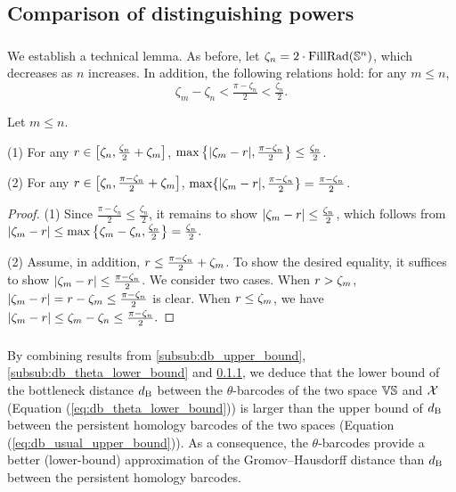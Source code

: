 \subsection{Comparison of distinguishing powers}
\label{subsub:main_theorem}

\subsubsection{}
\label{subsub:comparison_lemma}

We establish a technical lemma. 
As before, let $\zeta_n = 2 \cdot \operatorname{FillRad}(\mathbb{S}^n)$, which decreases as $n$ increases.
In addition, the following relations hold: for any $m \leq n$,
\[\zeta_m - \zeta_n < \tfrac{\pi - \zeta_n}{2} < \tfrac{\zeta_n}{2}.\]

\medskip\lemma
Let $m \leq n$. 

(1) For any $r \in \big[\zeta_n, \tfrac{\zeta_n}{2}+\zeta_m\big]$, $\max\big\{|\zeta_m  - r |, \tfrac{\pi - \zeta_n}{2}\big\} \leq \tfrac{\zeta_n}{2}$.

(2) For any $r \in \big[\zeta_n, \tfrac{\pi - \zeta_n}{2} + \zeta_m\big]$, $\max\{|\zeta_m  - r |, \tfrac{\pi - \zeta_n}{2}\} = \tfrac{\pi - \zeta_n}{2}$.

\begin{proof}
    	(1) Since $\tfrac{\pi - \zeta_n}{2} \leq \tfrac{\zeta_n}{2}$, it remains to show $|\zeta_m  - r | \leq \tfrac{\zeta_n}{2}$, which follows from
    	\(
    	|\zeta_m  - r | \leq \max\big\{\zeta_m - \zeta_n, \tfrac{\zeta_n}{2}\big\} = \tfrac{\zeta_n}{2}.
    	\)
     
    	(2) Assume, in addition, $r \leq \tfrac{\pi - \zeta_n}{2} + \zeta_m$. 
        To show the desired equality, it suffices to show $|\zeta_m  - r | \leq \tfrac{\pi - \zeta_n}{2}$. 
        We consider two cases.
        When $r > \zeta_m$, 
    	$|\zeta_m  - r | = r - \zeta_m \leq
        \tfrac{\pi - \zeta_n}{2}
    	$ is clear.
    	When $r \leq \zeta_m$, we have
    	\(
    	|\zeta_m  - r | \leq \zeta_m - \zeta_n
    	\leq \tfrac{\pi - \zeta_n}{2}.
    	\)
\end{proof}

\subsubsection{}
By combining results from \cref{subsub:db_upper_bound}, \cref{subsub:db_theta_lower_bound} and \cref{subsub:comparison_lemma}, we deduce that the lower bound of the bottleneck distance $d_{\mathrm{B}}$ between the $\theta$-barcodes of the two space $\mathbb{V}\mathbb{S}$ and $\mathcal{X}$ (Equation (\ref{eq:db_theta_lower_bound})) is larger than the upper bound of $d_{\mathrm{B}}$ between the persistent homology barcodes of the two spaces (Equation (\ref{eq:db_usual_upper_bound})).
As a consequence, the $\theta$-barcodes provide a better (lower-bound) approximation of the Gromov--Hausdorff distance than $d_{\mathrm{B}}$ between the persistent homology barcodes.

